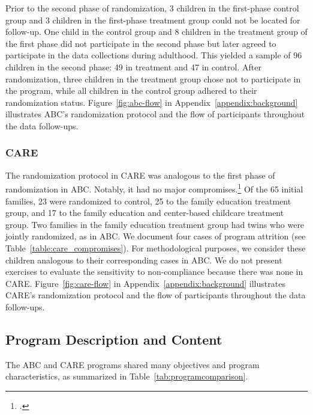 \noindent Prior to the second phase of randomization, 3 children in the first-phase control group and 3 children in the first-phase treatment group could not be located for follow-up. One child in the control group and 8 children in the treatment group of the first phase did not participate in the second phase but later agreed to participate in the data collections during adulthood. This yielded a sample of 96 children in the second phase: 49 in treatment and 47 in control. After randomization, three children in the treatment group chose not to participate in the program, while all children in the control group adhered to their randomization status. Figure~\ref{fig:abc-flow} in Appendix~\ref{appendix:background} illustrates ABC's randomization protocol and the flow of participants throughout the data follow-ups.\\

\subsubsection{CARE}

\noindent The randomization protocol in CARE was analogous to the first phase of randomization in ABC. Notably, it had no major compromises.\footnote{\citet{Bryant1987TIECSE,Wasik_Ramey_etal_1990_CD,Burchinal_Campbell_etal_1997_CD}.} Of the 65 initial families, 23 were randomized to control, 25 to the family education treatment group, and 17 to the family education and center-based childcare treatment group. Two families in the family education treatment group had twins who were jointly randomized, as in ABC. We document four cases of program attrition (see Table~\ref{table:care_compromises}). For methodological purposes, we consider these children analogous to their corresponding cases in ABC. We do not present exercises to evaluate the sensitivity to non-compliance because there was none in CARE. Figure~\ref{fig:care-flow} in Appendix~\ref{appendix:background} illustrates CARE's randomization protocol and the flow of participants throughout the data follow-ups.\\



\subsection{Program Description and Content}

\noindent The ABC and CARE programs shared many objectives and program characteristics, as summarized in Table~\ref{tab:programcomparison}.\\

